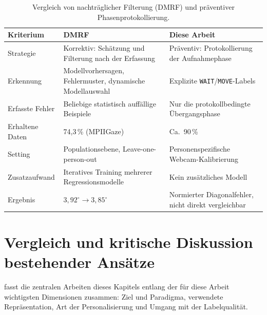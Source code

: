 \documentclass[
  11pt,
  a4paper,
  oneside,
  DIV=12,                 %
  BCOR=8mm,               %
  parskip=half,           %
  headings=normal,
  bibliography=totoc,     %
  listof=totoc            %
]{scrreprt}
\newcommand{\code}[1]{\texttt{#1}}
\begin{document}
\begin{table}[htbp]
  \centering
  \small
  \caption{Vergleich von nachträglicher Filterung (DMRF) und präventiver Phasenprotokollierung.}
  \label{tab:dmrf_vergleich}
  \begin{tabularx}{\textwidth}{L{3.0cm} Y Y}
    \toprule
    \textbf{Kriterium} & \textbf{DMRF~\cite{jiang2026dmrf}} & \textbf{Diese Arbeit} \\
    \midrule
    Strategie & Korrektiv: Schätzung und Filterung nach der Erfassung & Präventiv: Protokollierung der Aufnahmephase \\
    Erkennung & Modellvorhersagen, Fehlermuster, dynamische Modellauswahl & Explizite \code{WAIT}/\code{MOVE}-Labels \\
    Erfasste Fehler & Beliebige statistisch auffällige Beispiele & Nur die protokollbedingte Übergangsphase \\
    Erhaltene Daten & 74,3\,\% (MPIIGaze) & Ca.\ 90\,\% \\
    Setting & Populationsebene, Leave-one-person-out & Personenspezifische Webcam-Kalibrierung \\
    Zusatzaufwand & Iteratives Training mehrerer Regressionsmodelle & Kein zusätzliches Modell \\
    Ergebnis & $3,92^\circ \rightarrow 3,85^\circ$ & Normierter Diagonalfehler, nicht direkt vergleichbar \\
    \bottomrule
  \end{tabularx}
\end{table}

\section{Vergleich und kritische Diskussion bestehender Ansätze}
\label{sec:vergleich}
 fasst die zentralen Arbeiten dieses Kapitels entlang der für diese Arbeit wichtigsten Dimensionen zusammen: Ziel und Paradigma, verwendete Repräsentation, Art der Personalisierung und Umgang mit der Labelqualität.
\end{document}
